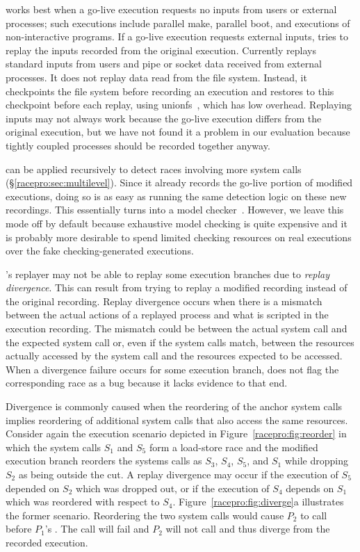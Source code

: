 \racepro works best when a go-live execution requests no inputs from users or
external processes; such executions include parallel make, parallel boot,
and executions of non-interactive programs.  If a go-live execution
requests external inputs, \racepro tries to replay the inputs recorded from
the original execution.  Currently \racepro replays standard inputs from users
and pipe or socket data received from external processes.  It does not
replay data read from the file system.  Instead, it checkpoints the file
system before recording an execution and restores to this checkpoint
before each replay, using unionfs~\cite{unionfs}, which has
low overhead.  Replaying inputs may not
always work because the go-live execution differs from the original
execution, but we have not found it a problem in our evaluation because
tightly coupled processes should be recorded together anyway.

\racepro can be applied recursively to detect races involving more system
calls (\S\ref{racepro:sec:multilevel}). Since it already records the go-live
portion of modified executions, doing so is as easy as running the
same detection logic on these new recordings. This essentially turns
\racepro into a model checker~\cite{flanagan:dynamicpo}. However, we leave
this mode off by default because exhaustive model checking is quite
expensive and it is probably more desirable to spend limited checking
resources on real executions over the fake checking-generated
executions.

\racepro's replayer may not be able to replay some execution branches due
to \emph{replay divergence}.  This can result from trying to replay a
modified recording instead of the original recording.
Replay divergence occurs when there is a mismatch between the actual
actions of a replayed process and what
is scripted in the execution recording. The mismatch could be between
the actual system call and the expected system call or, even if the
system calls match, between the resources actually accessed by the
system call and the resources expected to be accessed.  When a
divergence failure occurs for some execution branch, \racepro does not
flag the corresponding race as a bug because it lacks evidence to that
end.

Divergence is commonly caused when the reordering of the anchor system
calls implies reordering of additional system calls that also access
the same resources. Consider again the execution scenario depicted in
Figure~\ref{racepro:fig:reorder} in which the system calls $S_1$ and
$S_5$ form a load-store race and the modified execution branch
reorders the systems calls as $S_3$, $S_4$, $S_5$, and $S_1$ while
dropping $S_2$ as being outside the cut.  A replay divergence may
occur if the execution of $S_5$ depended on $S_2$ which was dropped
out, or if the execution of $S_4$ depends on $S_1$ which was reordered
with respect to $S_4$. Figure~\ref{racepro:fig:diverge}a illustrates the
former scenario.   Reordering the two  system calls would cause
$P_2$ to call  before $P_1$'s .  The call will fail
and $P_2$ will not call  and thus diverge from the recorded
execution. 

